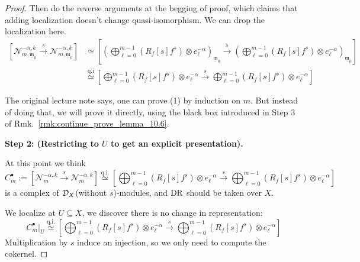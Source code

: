 \begin{proof}
    Then do the reverse arguments at the begging of proof, which claims that adding localization doesn't change quasi-isomorphism.
    We can drop the localization here.
    \begin{align*}
        \left[\mathcal{N}^{-\alpha,k}_{m,\underline{\mathfrak{m}}_{0}} \xrightarrow{s}\mathcal{N}^{-\alpha,k}_{m,\underline{\mathfrak{m}}_{0}}\right] & \simeq \left[\left(\bigoplus \limits_{\ell=0}^{m-1} \left(R_{f}[s]f^{s}\right) \otimes e_{\ell}^{-\alpha}\right)_{\underline{\mathfrak{m}}_0} \xrightarrow{s} \left(\bigoplus \limits_{\ell=0}^{m-1}\left(R_{f}[s]f^{s}\right) \otimes e_{\ell}^{-\alpha}\right)_{\underline{\mathfrak{m}}_0}\right] \\
                                                                                                                                                      & \stackrel{\text{q.i}}{\simeq} \left[\bigoplus \limits_{\ell=0}^{m-1} \left(R_{f}[s]f^{s}\right) \otimes e_{\ell}^{-\alpha} \xrightarrow{s} \bigoplus \limits_{\ell=0}^{m-1}\left(R_{f}[s]f^{s}\right) \otimes e_{\ell}^{-\alpha}\right]
    \end{align*}

    The original lecture note says, one can prove (1) by induction on $m$.
    But instead of doing that, we will prove it directly,
    using the black box introduced in Step 3 of Rmk.~\ref{rmk:continue_prove_lemma_10.6}.

    \medskip

    \noindent\textbf{Step 2: (Restricting to $U$ to get an explicit presentation).}

    At this point we think
    \[
        C_m^\bullet := \left[\mathcal{N}_m^{-\alpha, k} \xrightarrow{s} \mathcal{N}_m^{-\alpha, k}\right] \stackrel{\mathrm{q.i.}}{\simeq} \left[\bigoplus_{\ell=0}^{m-1} \left(R_{f}[s]f^{s}\right) \otimes e_{\ell}^{-\alpha} \xrightarrow{s} \bigoplus_{\ell=0}^{m-1} \left(R_{f}[s]f^{s}\right) \otimes e_{\ell}^{-\alpha}\right]
    \]
    is a complex of $\mathcal{D}_X$(without $s$)-modules, and $\mathrm{DR}$ should be taken over $X$.

    We localize at $U\subseteq X$, we discover there is no change in representation:
    \[
        C_m^\bullet|_{U} \stackrel{\mathrm{q.i.}}{\simeq} \left[\bigoplus_{\ell=0}^{m-1} \left(R_{f}[s]f^{s}\right) \otimes e_{\ell}^{-\alpha} \xrightarrow{s} \bigoplus_{\ell=0}^{m-1} \left(R_{f}[s]f^{s}\right) \otimes e_{\ell}^{-\alpha}\right]
    \]
    Multiplication by $s$ induce an injection, so we only need to compute the cokernel.


\end{proof}
